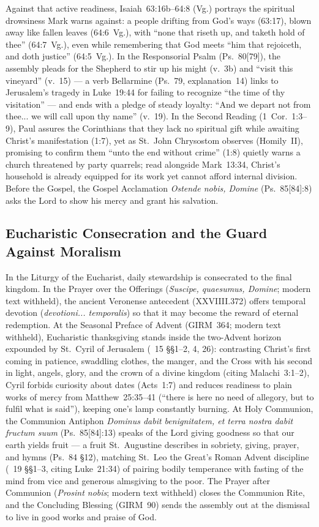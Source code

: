 Against that active readiness, Isaiah~63:16b--64:8 (Vg.) portrays the spiritual drowsiness Mark warns against: a people drifting from God's ways (63:17), blown away like fallen leaves (64:6~Vg.), with ``none that riseth up, and taketh hold of thee'' (64:7~Vg.), even while remembering that God meets ``him that rejoiceth, and doth justice'' (64:5~Vg.). In the Responsorial Psalm (Ps.~80[79]), the assembly pleads for the Shepherd to stir up his might (v.~3b) and ``visit this vineyard'' (v.~15) --- a verb Bellarmine (Ps.~79, explanation~14) links to Jerusalem's tragedy in Luke~19:44 for failing to recognize ``the time of thy visitation'' --- and ends with a pledge of steady loyalty: ``And we depart not from thee... we will call upon thy name'' (v.~19). In the Second Reading (1~Cor.~1:3--9), Paul assures the Corinthians that they lack no spiritual gift while awaiting Christ's manifestation (1:7), yet as St.~John Chrysostom observes (Homily~II), promising to confirm them ``unto the end without crime'' (1:8) quietly warns a church threatened by party quarrels; read alongside Mark~13:34, Christ's household is already equipped for its work yet cannot afford internal division. Before the Gospel, the Gospel Acclamation \emph{Ostende nobis, Domine} (Ps.~85[84]:8) asks the Lord to show his mercy and grant his salvation.

\subsection{Eucharistic Consecration and the Guard Against Moralism}

In the Liturgy of the Eucharist, daily stewardship is consecrated to the final kingdom. In the Prayer over the Offerings (\emph{Suscipe, quaesumus, Domine}; modern text withheld), the ancient Veronense antecedent (XXVIIII.372) offers temporal devotion (\emph{devotioni... temporalis}) so that it may become the reward of eternal redemption. At the Seasonal Preface of Advent (GIRM~364; modern text withheld), Eucharistic thanksgiving stands inside the two-Advent horizon expounded by St.~Cyril of Jerusalem (~15 §§1--2, 4, 26): contrasting Christ's first coming in patience, swaddling clothes, the manger, and the Cross with his second in light, angels, glory, and the crown of a divine kingdom (citing Malachi~3:1--2), Cyril forbids curiosity about dates (Acts~1:7) and reduces readiness to plain works of mercy from Matthew~25:35--41 (``there is here no need of allegory, but to fulfil what is said''), keeping one's lamp constantly burning. At Holy Communion, the Communion Antiphon \emph{Dominus dabit benignitatem, et terra nostra dabit fructum suum} (Ps.~85[84]:13) speaks of the Lord giving goodness so that our earth yields fruit --- a fruit St.~Augustine describes in sobriety, giving, prayer, and hymns (Ps.~84 §12), matching St.~Leo the Great's Roman Advent discipline (~19 §§1--3, citing Luke~21:34) of pairing bodily temperance with fasting of the mind from vice and generous almsgiving to the poor. The Prayer after Communion (\emph{Prosint nobis}; modern text withheld) closes the Communion Rite, and the Concluding Blessing (GIRM~90) sends the assembly out at the dismissal to live in good works and praise of God.

